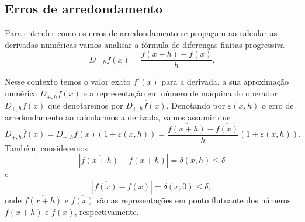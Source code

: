 \subsection{Erros de arredondamento}
Para entender como os erros de arredondamento se propagam ao calcular as derivadas numéricas vamos analisar a fórmula de diferenças finitas progressiva
\begin{equation}
  D_{+,h}f(x) =\frac{f(x+h)-f(x)}{h}.  
\end{equation}

Nesse contexto temos o valor exato $f'(x)$ para a derivada, a sua aproximação numérica $D_{+,h}f(x)$ e a representação em número de máquina do operador $D_{+,h}f(x)$ que denotaremos por $\overline{D_{+,h}f(x)}$. Denotando por $\varepsilon(x,h)$ o erro de arredondamento ao calcularmos a derivada, vamos assumir que
\begin{equation}\label{ex:ea_dp}
\overline{D_{+,h}f(x)}=D_{+,h}f(x)(1+\varepsilon(x,h))=\frac{\overline{f(x+h)}-\overline{f(x)}}{h}(1+\varepsilon(x,h)).  
\end{equation}
Também, consideremos
\begin{equation}
|\overline{f(x+h)}-f(x+h)|=\delta(x,h)\leq \delta  
\end{equation}
e
\begin{equation}
  |\overline{f(x)}-f(x)|=\delta(x,0)\leq \delta,  
\end{equation}
onde $\overline{f(x+h)}$ e $\overline{f(x)}$ são as representações em ponto flutuante dos números $f(x+h)$ e $f(x)$, respectivamente. 

